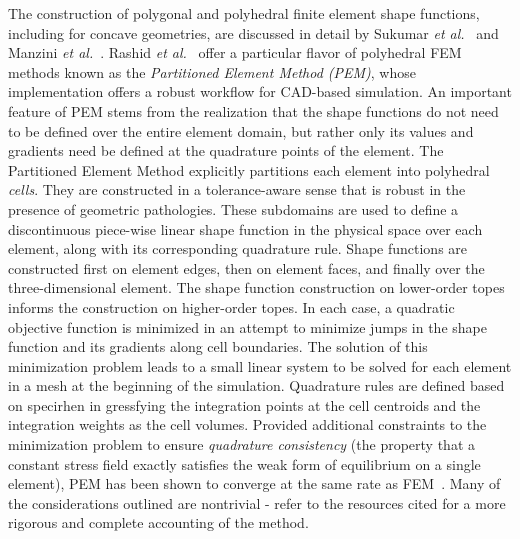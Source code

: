 The construction of polygonal and polyhedral finite element shape functions, including for concave geometries, are discussed in detail by Sukumar \textit{et al.}~\cite{sukumar_2006} and Manzini \textit{et al.}~\cite{manzini_2014}. Rashid \textit{et al.}~\cite{rashid_2012, rashid_2015} offer a particular flavor of polyhedral FEM methods known as the \textit{Partitioned Element Method (PEM)}, whose implementation offers a robust workflow for CAD-based simulation. An important feature of PEM stems from the realization that the shape functions do not need to be defined over the entire element domain, but rather only its values and gradients need be defined at the quadrature points of the element. The Partitioned Element Method explicitly partitions each element into polyhedral \textit{cells}. They are constructed in a tolerance-aware sense that is robust in the presence of geometric pathologies. These subdomains are used to define a discontinuous piece-wise linear shape function in the physical space over each element, along with its corresponding quadrature rule. Shape functions are constructed first on element edges, then on element faces, and finally over the three-dimensional element. The shape function construction on lower-order topes informs the construction on higher-order topes. In each case, a quadratic objective function is minimized in an attempt to minimize jumps in the shape function and its gradients along cell boundaries. The solution of this minimization problem leads to a small linear system to be solved for each element in a mesh at the beginning of the simulation. Quadrature rules are defined based on specirhen in gressfying the integration points at the cell centroids and the integration weights as the cell volumes. Provided additional constraints to the minimization problem to ensure \textit{quadrature consistency} (the property that a constant stress field exactly satisfies the weak form of equilibrium on a single element), PEM has been shown to converge at the same rate as FEM~\cite{rashid_2012}. Many of the considerations outlined are nontrivial - refer to the resources cited for a more rigorous and complete accounting of the method.

